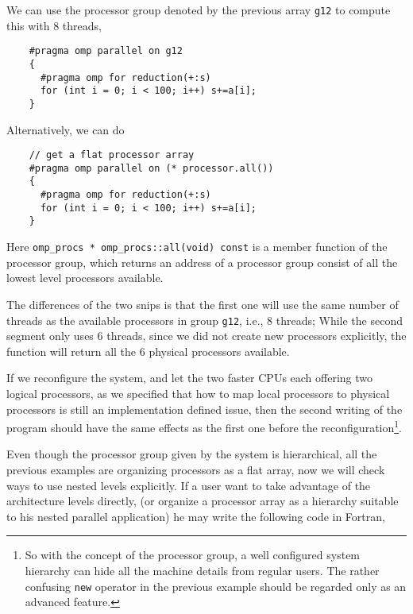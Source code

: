 We can use the processor group denoted by the previous array \texttt{g12} to compute
this with 8 threads,

{\footnotesize
\begin{verbatim}
    #pragma omp parallel on g12
    {
      #pragma omp for reduction(+:s)
      for (int i = 0; i < 100; i++) s+=a[i];
    }
\end{verbatim}
}

Alternatively, we can do

{\footnotesize
\begin{verbatim}
    // get a flat processor array
    #pragma omp parallel on (* processor.all())
    {
      #pragma omp for reduction(+:s)
      for (int i = 0; i < 100; i++) s+=a[i];
    }
\end{verbatim}
}

Here \texttt{omp\_procs * omp\_procs::all(void) const} is a member function of
the processor group, which returns an address of a processor group consist of
all the lowest level processors available.

The differences of the two snips is that the first one will use the same number
of threads as the available processors in group \texttt{g12}, i.e., 8 threads;
While the second segment only uses 6 threads, since we did not create new
processors explicitly, the function will return all the 6 physical processors
available.

If we reconfigure the system, and let the two faster CPUs each offering two
logical processors, as we specified that how to map local processors to physical
processors is still an implementation defined issue, then the second writing of
the program should have the same effects as the first one before the
reconfiguration\footnote{So with the concept of the processor group, a well configured
system hierarchy can hide all the machine details from regular users. The
rather confusing \texttt{new} operator in the previous example should be
regarded only as an advanced feature.}.

Even though the processor group given by the system is hierarchical, all the
previous examples are organizing processors as a flat array, now we will check
ways to use nested levels explicitly. If a user want to take advantage of the
architecture levels directly, (or organize a processor array as a hierarchy
suitable to his nested parallel application) he may write the following code in Fortran,

